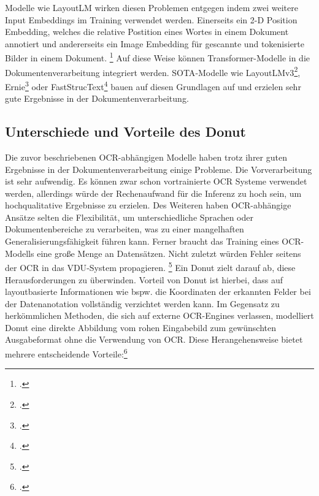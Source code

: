 Modelle wie LayoutLM wirken diesen Problemen entgegen indem zwei weitere Input Embeddings im Training verwendet werden. Einerseits ein 2-D Position Embedding, welches die relative Postition eines Wortes in einem Dokument annotiert und andererseits ein Image Embedding für gescannte und tokenisierte Bilder in einem Dokument. \footcites[Vgl.][S. 1193]{xu_layoutlm_2020} Auf diese Weise können Transformer-Modelle in die Dokumentenverarbeitung integriert werden. \ac{SOTA}-Modelle wie LayoutLMv3\footcites[Vgl. dazu ausführlich][]{huang_layoutlmv3_2022}, Ernie\footcites[Vgl. dazu ausführlich][]{peng_ernie-layout_2022} oder FastStrucText\footcites[Vgl. dazu ausführlich][]{zhai_fast-structext_2023} bauen auf diesen Grundlagen auf und erzielen sehr gute Ergebnisse in der Dokumentenverarbeitung.
\subsection{Unterschiede und Vorteile des Donut}
Die zuvor beschriebenen OCR-abhängigen Modelle haben trotz ihrer guten Ergebnisse in der Dokumentenverarbeitung einige Probleme. Die Vorverarbeitung ist sehr aufwendig. Es können zwar schon vortrainierte OCR Systeme verwendet werden, allerdings würde der Rechenaufwand für die Inferenz zu hoch sein, um hochqualitative Ergebnisse zu erzielen. Des Weiteren haben OCR-abhängige Ansätze selten die Flexibilität, um unterschiedliche Sprachen oder Dokumentenbereiche zu verarbeiten, was zu einer mangelhaften Generalisierungsfähigkeit führen kann. Ferner braucht das Training eines OCR-Modells eine große Menge an Datensätzen. Nicht zuletzt würden Fehler seitens der OCR in das \ac{VDU}-System propagieren. \footcites[Vgl.][S. 2]{kim_ocr-free_2021} Ein 
Donut zielt darauf ab, diese Herausforderungen zu überwinden. Vorteil von Donut ist hierbei, dass auf layoutbasierte Informationen wie bspw. die Koordinaten der erkannten Felder bei der Datenanotation vollständig verzichtet werden kann. Im Gegensatz zu herkömmlichen Methoden, die sich auf externe OCR-Engines verlassen, modelliert Donut eine direkte Abbildung vom rohen Eingabebild zum gewünschten Ausgabeformat ohne die Verwendung von OCR. Diese Herangehensweise bietet mehrere entscheidende Vorteile:\footcites[Vgl.][S. 3]{kim_ocr-free_2021}

